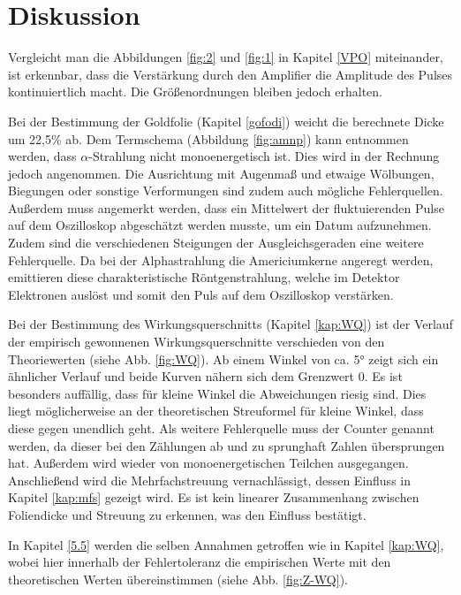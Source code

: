 \section{Diskussion}
Vergleicht man die Abbildungen \ref{fig:2} und \ref{fig:1} in Kapitel \ref{VPO} miteinander,
ist erkennbar, dass die Verstärkung durch den Amplifier die Amplitude des Pulses
kontinuiertlich macht.
Die Größenordnungen bleiben jedoch erhalten.

Bei der Bestimmung der Goldfolie (Kapitel \ref{gofodi}) weicht die berechnete Dicke um 22,5\% ab.
Dem Termschema (Abbildung \ref{fig:amnp}) kann entnommen werden, dass $\alpha$-Strahlung nicht monoenergetisch ist.
Dies wird in der Rechnung jedoch angenommen.
Die Ausrichtung mit Augenmaß und etwaige Wölbungen, Biegungen oder sonstige Verformungen sind zudem auch mögliche Fehlerquellen.
Außerdem muss angemerkt werden, dass ein Mittelwert der fluktuierenden Pulse auf dem Oszilloskop abgeschätzt werden musste, um ein Datum aufzunehmen.
Zudem sind die verschiedenen Steigungen der Ausgleichsgeraden eine weitere Fehlerquelle.
Da bei der Alphastrahlung die Americiumkerne angeregt werden, emittieren diese charakteristische Röntgenstrahlung,
welche im Detektor Elektronen auslöst und somit den Puls auf dem Oszilloskop verstärken.

Bei der Bestimmung des Wirkungsquerschnitts (Kapitel \ref{kap:WQ}) ist der Verlauf der empirisch gewonnenen Wirkungsquerschnitte verschieden von den Theoriewerten (siehe Abb. \ref{fig:WQ}).
Ab einem Winkel von ca. 5° zeigt sich ein ähnlicher Verlauf und beide Kurven nähern sich dem Grenzwert 0.
Es ist besonders auffällig, dass für kleine Winkel die Abweichungen riesig sind.
Dies liegt möglicherweise an der theoretischen Streuformel für kleine Winkel, dass diese gegen unendlich geht.
Als weitere Fehlerquelle muss der Counter genannt werden, da dieser bei den Zählungen ab und zu sprunghaft Zahlen übersprungen hat.
Außerdem wird wieder von monoenergetischen Teilchen ausgegangen.
Anschließend wird die Mehrfachstreuung vernachlässigt, dessen Einfluss in Kapitel \ref{kap:mfs} gezeigt wird.
Es ist kein linearer Zusammenhang zwischen Foliendicke und Streuung zu erkennen, was den Einfluss bestätigt.

In Kapitel \ref{5.5} werden die selben Annahmen getroffen wie in Kapitel \ref{kap:WQ},
wobei hier innerhalb der Fehlertoleranz die empirischen Werte mit den theoretischen Werten übereinstimmen (siehe Abb. \ref{fig:Z-WQ}).
